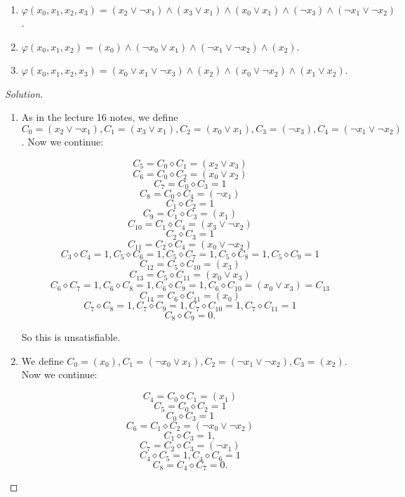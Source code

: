 \documentclass[11pt]{article}
\begin{document}
\begin{enumerate}
  \begin{enumerate}
      \item $\varphi(x_0, x_1, x_2, x_3) = (x_2 \vee \neg x_1) \wedge (x_3 \vee x_1) \wedge (x_0 \vee x_1) \wedge (\neg x_3) \wedge (\neg x_1 \vee \neg x_2)$.

      \item $\varphi(x_0, x_1, x_2) = (x_0) \wedge (\neg x_0 \vee x_1) \wedge (\neg x_1 \vee \neg x_2) \wedge (x_2)$.
      
      \item $\varphi(x_0, x_1, x_2, x_3) = (x_0 \vee x_1 \vee \neg x_3) \wedge (x_2) \wedge (x_0 \vee \neg x_2) \wedge (x_1 \vee x_2)$.

  \end{enumerate}
  
\begin{proof}[Solution]

\begin{enumerate}
\item As in the lecture 16 notes, we define $C_0 = (x_2 \vee \neg x_1), C_1 = (x_3 \vee x_1), C_2 = (x_0 \vee x_1), C_3 = (\neg x_3), C_4 = (\neg x_1 \vee \neg x_2)$. Now we continue:

$$
C_5 = C_0 \diamond C_1 = (x_2 \vee x_3)
$$ $$
C_6 = C_0 \diamond C_2 = (x_0 \vee x_2)
$$ $$
C_7 = C_0 \diamond C_3 = 1
$$ $$
C_8 = C_0 \diamond C_4 = (\neg x_1)
$$ $$
C_1 \diamond C_2 = 1
$$ $$
C_9 = C_1 \diamond C_3 = ( x_1 )
$$ $$
C_{10} = C_1 \diamond C_4 = (x_3 \vee \neg x_2 )
$$ $$
C_2 \diamond C_3 = 1
$$ $$
C_{11} = C_2 \diamond C_4 = (x_0 \vee \neg x_2 )
$$ $$
C_3 \diamond C_4 = 1, C_5 \diamond C_6 = 1, C_5 \diamond C_7 = 1, C_5 \diamond C_8 = 1, C_5 \diamond C_9 = 1
$$ $$
C_{12} = C_5 \diamond C_{10} = (x_3)
$$ $$
C_{13} = C_5 \diamond C_{11} = (x_0 \vee x_3)
$$ $$
C_6 \diamond C_7 = 1, C_6 \diamond C_8 = 1, C_6 \diamond C_9 = 1, C_6 \diamond C_{10} = (x_0 \vee x_3) = C_{13}
$$ $$
C_{14} = C_6 \diamond C_{11} = (x_0)
$$ $$
C_7 \diamond C_{8} = 1, C_7 \diamond C_{9} = 1, C_7 \diamond C_{10} = 1, C_7 \diamond C_{11} = 1
$$ $$
C_8 \diamond C_{9} = 0.
$$

So this is unsatisfiable.

\item We define $C_0 = (x_0), C_1 = (\neg x_0 \vee x_1), C_2 = (\neg x_1 \vee \neg x_2), C_3 = (x_2)$. Now we continue:

$$
C_4 = C_0 \diamond C_1 = (x_1)
$$ $$
C_5 = C_0 \diamond C_2 = 1
$$  $$
C_0 \diamond C_3 = 1
$$ $$
C_6 = C_1 \diamond C_2 = (\neg x_0 \vee \neg x_2 )
$$ $$
C_1 \diamond C_3 = 1,
$$ $$
C_7 = C_2 \diamond C_3 = (\neg x_1)
$$ $$
C_4 \diamond C_5 = 1, C_4 \diamond C_6 = 1
$$ $$
C_8 = C_4 \diamond C_7 = 0.
$$


\end{enumerate}
\end{proof}
\end{enumerate}
\end{document}
